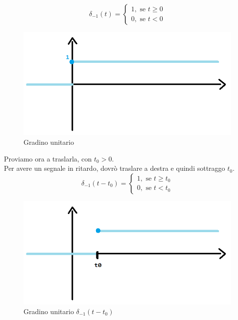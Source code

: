 	\begin{equation*}
	\delta_{-1}(t)=
	\begin{cases} 
	1, \mbox{ se } t \geq 0\\ 
	0, \mbox{ se } t < 0
	\end{cases} 
	\end{equation*}
	
	\begin{figure}[h]
		\centering
		\includegraphics[scale=0.5]{immagini/gradinoContinuo}
		\caption{ Gradino unitario}
		\label{fig: gradinoContinuo}
	\end{figure}
	
	Proviamo ora a traslarla, con $ t_0 > 0$.\\
	
	Per avere un segnale in ritardo, dovrò traslare a destra e quindi sottraggo $t_0$.\\
	
	\begin{equation*}
	\delta_{-1}(t - t_0 )=
	\begin{cases} 
	1, \mbox{ se } t \geq t_0\\ 
	0, \mbox{ se } t < t_0
	\end{cases} 
	\end{equation*}
	
	\begin{figure}[h]
		\centering
		\includegraphics[scale=0.5]{immagini/gradinoContinuoMeno}
		\caption{ Gradino unitario $ \delta_{-1}(t - t_0 ) $ }
		\label{fig: gradinoContinuoMeno}
	\end{figure}
	
